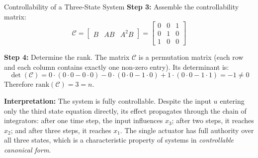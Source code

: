 \begin{examplebox}{Controllability of a Three-State System}
\textbf{Step 3:} Assemble the controllability matrix:
\begin{equation*}
	\mathcal{C} = \begin{bmatrix} B & AB & A^2 B \end{bmatrix}
	= \begin{bmatrix} 0 & 0 & 1 \\ 0 & 1 & 0 \\ 1 & 0 & 0 \end{bmatrix}
\end{equation*}

\textbf{Step 4:} Determine the rank. The matrix $\mathcal{C}$ is a permutation matrix (each row and each column contains exactly one non-zero entry). Its determinant is:
\begin{equation*}
	\det(\mathcal{C}) = 0 \cdot (0 \cdot 0 - 0 \cdot 0) - 0 \cdot (0 \cdot 0 - 1 \cdot 0) + 1 \cdot (0 \cdot 0 - 1 \cdot 1) = -1 \neq 0
\end{equation*}
Therefore $\text{rank}(\mathcal{C}) = 3 = n$.

\textbf{Interpretation:} The system is fully controllable. Despite the input $u$ entering only the third state equation directly, its effect propagates through the chain of integrators: after one time step, the input influences $x_3$; after two steps, it reaches $x_2$; and after three steps, it reaches $x_1$. The single actuator has full authority over all three states, which is a characteristic property of systems in \textit{controllable canonical form}.
\end{examplebox}

